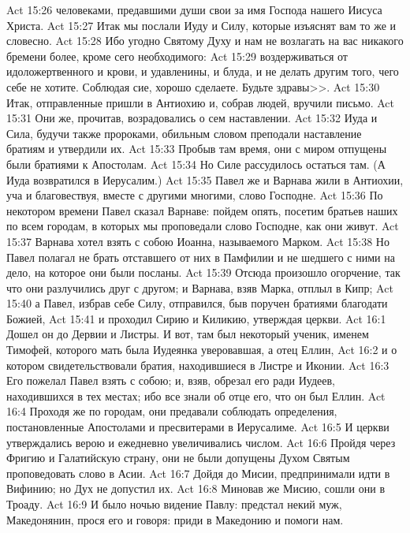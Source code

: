 \vs Act 15:26 человеками, предавшими души свои за имя Господа нашего Иисуса Христа.
\vs Act 15:27 Итак мы послали Иуду и Силу, которые изъяснят вам то же и словесно.
\vs Act 15:28 Ибо угодно Святому Духу и нам не возлагать на вас никакого бремени более, кроме сего необходимого:
\vs Act 15:29 воздерживаться от идоложертвенного и крови, и удавленины, и блуда, и не делать другим того, чего себе не хотите. Соблюдая сие, хорошо сделаете. Будьте здравы>>.
\rsbpar\vs Act 15:30 Итак, отправленные пришли в Антиохию и, собрав людей, вручили письмо.
\vs Act 15:31 Они же, прочитав, возрадовались о сем наставлении.
\vs Act 15:32 Иуда и Сила, будучи также пророками, обильным словом преподали наставление братиям и утвердили их.
\vs Act 15:33 Пробыв там  время, они с миром отпущены были братиями к Апостолам.
\vs Act 15:34 Но Силе рассудилось остаться там. (А Иуда возвратился в Иерусалим.)
\vs Act 15:35 Павел же и Варнава жили в Антиохии, уча и благовествуя, вместе с другими многими, слово Господне.
\rsbpar\vs Act 15:36 По некотором времени Павел сказал Варнаве: пойдем опять, посетим братьев наших по всем городам, в которых мы проповедали слово Господне, как они живут.
\vs Act 15:37 Варнава хотел взять с собою Иоанна, называемого Марком.
\vs Act 15:38 Но Павел полагал не брать отставшего от них в Памфилии и не шедшего с ними на дело, на которое они были посланы.
\vs Act 15:39 Отсюда произошло огорчение, так что они разлучились друг с другом; и Варнава, взяв Марка, отплыл в Кипр;
\vs Act 15:40 а Павел, избрав себе Силу, отправился, быв поручен братиями благодати Божией,
\vs Act 15:41 и проходил Сирию и Киликию, утверждая церкви.
\vs Act 16:1 Дошел он до Дервии и Листры. И вот, там был некоторый ученик, именем Тимофей, которого мать была Иудеянка уверовавшая, а отец Еллин,
\vs Act 16:2 и о котором свидетельствовали братия, находившиеся в Листре и Иконии.
\vs Act 16:3 Его пожелал Павел взять с собою; и, взяв, обрезал его ради Иудеев, находившихся в тех местах; ибо все знали об отце его, что он был Еллин.
\vs Act 16:4 Проходя же по городам, они предавали  соблюдать определения, постановленные Апостолами и пресвитерами в Иерусалиме.
\vs Act 16:5 И церкви утверждались верою и ежедневно увеличивались числом.
\rsbpar\vs Act 16:6 Пройдя через Фригию и Галатийскую страну, они не были допущены Духом Святым проповедовать слово в Асии.
\vs Act 16:7 Дойдя до Мисии, предпринимали идти в Вифинию; но Дух не допустил их.
\vs Act 16:8 Миновав же Мисию, сошли они в Троаду.
\vs Act 16:9 И было ночью видение Павлу: предстал некий муж, Македонянин, прося его и говоря: приди в Македонию и помоги нам.
